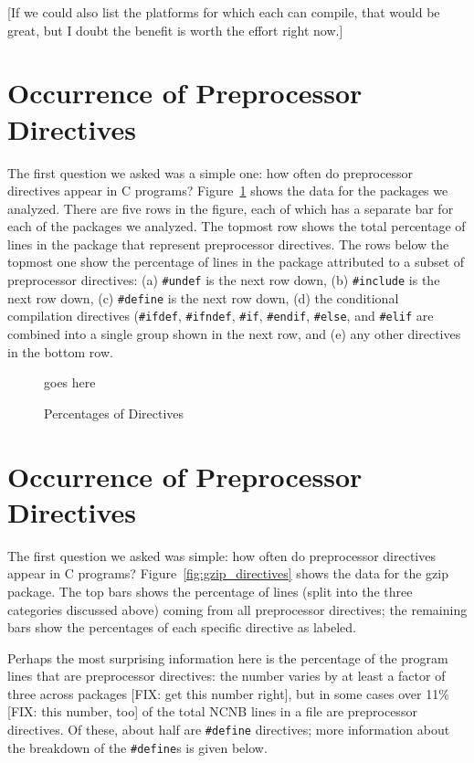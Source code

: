[If we could also list the platforms for which each can compile, that
would be great, but I doubt the benefit is worth the effort right
now.]

\section{Occurrence of Preprocessor Directives}\label{sec:directives}

The first question we asked was a simple one: how often do
preprocessor directives appear in C programs?
Figure~\ref{fig:directives} shows the data for the packages we
analyzed.  There are five rows in the figure, each of which has a
separate bar for each of the packages we analyzed.  The topmost row
shows the total percentage of lines in the package that represent
preprocessor directives.  The rows below the topmost one show the
percentage of lines in the package attributed to a subset of
preprocessor directives: (a) \verb+#undef+ is the next row down, (b)
\verb+#include+ is the next row down, (c) \verb+#define+ is the next
row down, (d) the conditional compilation directives (\verb+#ifdef+,
\verb+#ifndef+, \verb+#if+, \verb+#endif+, \verb+#else+, and
\verb+#elif+ are combined into a single group shown in the next row,
and (e) any other directives in the bottom row. 

\begin{figure}
goes here

\caption{Percentages of Directives\label{fig:directives}}
\end{figure}

\section{Occurrence of Preprocessor Directives}\label{sec:directives}

The first question we asked was simple: how often do preprocessor
directives appear in C programs?  Figure~\ref{fig:gzip_directives} shows
the data for the gzip package.  The top bars shows the percentage of
lines (split into the three categories discussed above) coming from all
preprocessor directives; the remaining bars show the percentages of each
specific directive as labeled. 

Perhaps the most surprising information here is the percentage of the
program lines that are preprocessor directives: the number varies by
at least a factor of three across packages [FIX: get this number
right], but in some cases over 11\% [FIX: this number, too] of the
total NCNB lines in a file are preprocessor directives.  Of these,
about half are \verb+#define+ directives; more information about the
breakdown of the \verb+#define+s is given below.

